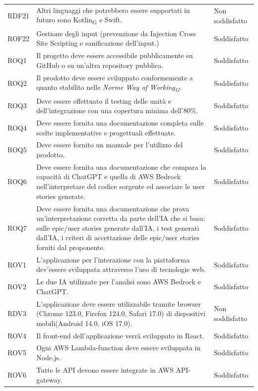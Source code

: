 \documentclass{article}
\begin{document}
{\begin{center}
    \begin{tabular}{|P{2cm}| P{10cm}| P{4cm}|}
\hline
{}
\hline
{}
RDF21 & Altri linguaggi che potrebbero essere supportati in futuro sono Kotlin\textsubscript{G} e Swift.& Non soddisfatto\\
ROF22 & Gestione degli input (prevenzione da Injection Cross Site Scripting e sanificazione dell'input.) & Soddisfatto \\
ROQ1& Il progetto deve essere accessibile pubblicamente su GitHub o su un'altra repository pubblica. & Soddisfatto\\ 
\hline
ROQ2 & Il prodotto deve essere sviluppato conformemente a quanto stabilito nelle \textit{Norme Way of Working\textsubscript{G}}.& Soddisfatto \\ 
\hline
ROQ3 & Deve essere effettuato il testing delle unità e dell'integrazione con una copertura minima dell'80\%.& Soddisfatto\\
\hline
{}
ROQ4 & Deve essere fornita una documentazione completa sulle scelte implementative e progettuali effettuate. & Soddisfatto\\
\hline
{}
ROQ5& Deve essere fornito un manuale per l'utilizzo del prodotto. & Soddisfatto\\
\hline
{}
ROQ6& Deve essere fornita una documentazione che compara la capacità di ChatGPT e quella di AWS Bedrock nell'interpretare del codice sorgente ed associare le user stories generate. & Soddisfatto\\
\hline
{}
ROQ7&  Deve essere fornita una documentazione che prova un'interpretazione corretta da parte dell'IA che si basa: sulle epic/user stories generate dall'IA, i test generati dall'IA, i criteri di accettazione delle epic/user stories forniti dal proponente. & Soddisfatto\\
\hline
ROV1& L'applicazione per l'interazione con la piattaforma dev'essere sviluppata attraverso l'uso di tecnologie web. & Soddisfatto\\ 
\hline
{}
ROV2& Le due IA utilizzate per l'analisi sono AWS Bedrock e ChatGPT. & Soddisfatto \\ 
\hline
RDV3& L'applicazione deve essere utilizzabile tramite browser (Chrome 123.0, Firefox 124.0, Safari 17.0) di dispositivi mobili(Android 14.0, iOS 17.0). & Non soddisfatto\\
\hline
{}
ROV4& Il front-end dell'applicazione verrà sviluppato in React. & Soddisfatto\\
\hline
ROV5& Ogni AWS Lambda-function deve essere sviluppata in Node.js.& Soddisfatto\\
\hline
{}
ROV6& Tutte le API devono essere integrate in AWS API-gateway.& Soddisfatto\\
\hline
\end{tabular}



\end{center}}
\end{document}
